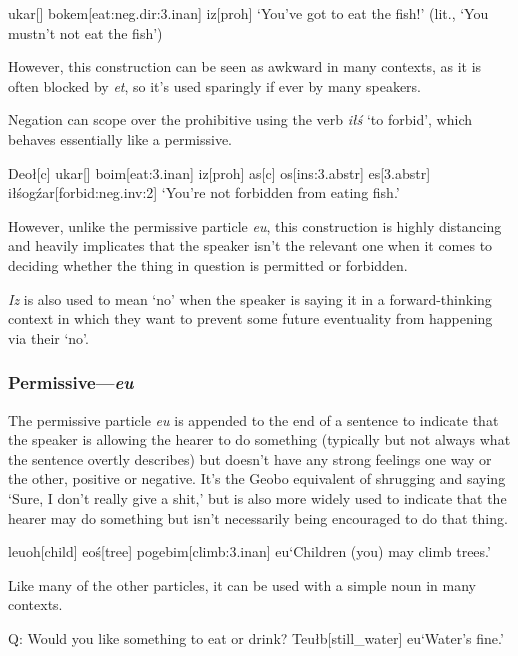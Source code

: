 \documentclass[a4paper,11pt,oneside,openany]{memoir}
\begin{document}
\ex 
\begingl
\Engma u\vz[fish]
kar[]
bo\vs kem[eat:{\sc neg.dir:3.inan}]
iz[\sc proh]
\glft `You've got to eat the fish!' (lit., `You mustn't not eat the fish')
\endgl
\xe

However, this construction can be seen as awkward in many contexts, as it is often blocked by \textit{\vd et}, so it's used sparingly if ever by many speakers.

Negation can scope over the prohibitive using the verb \textit{i\l\'s} `to forbid', which behaves essentially like a permissive.

\ex 
\begingl
Deo\l[\sc c]
\engma u\vz[fish]
kar[]
bo\vs im[eat:{\sc 3.inan}]
iz[\sc proh]
\nogloss{,}
as[\sc c]
\vc os[\sc ins:3.abstr]
es[\sc 3.abstr]
i\l\'sog\'zar[forbid:{\sc neg.inv:2}]
\glft `You're not forbidden from eating fish.'
\endgl
\xe

However, unlike the permissive particle \textit{eu\vs}, this construction is highly distancing and heavily implicates that the speaker isn't the relevant one when it comes to deciding whether the thing in question is permitted or forbidden.

\textit{Iz} is also used to mean `no' when the speaker is saying it in a forward-thinking context in which they want to prevent some future eventuality from happening via their `no'.

\subsubsection{Permissive---\textit{eu\vs}} 

The permissive particle \textit{eu\vs} is appended to the end of a sentence to indicate that the speaker is allowing the hearer to do something (typically but not always what the sentence overtly describes) but doesn't have any strong feelings one way or the other, positive or negative. It's the Geobo{\engma} equivalent of shrugging and saying `Sure, I don't really give a shit,' but is also more widely used to indicate that the hearer may do something but isn't necessarily being encouraged to do that thing.

\ex
\begingl
\vZ leuoh[child]
\vd eo\'s[tree]
pogebim[climb:{\sc 3.inan}]
eu\vs[\sc perm]
\glft `Children (you) may climb trees.'
\endgl
\xe

Like many of the other particles, it can be used with a simple noun in many contexts.

\ex 
\begingl
\glpreamble
Q: Would you like something to eat or drink?
\endpreamble
{}
Teu\l b[still\_water]
eu\vs[\sc perm]
\glft\phantom{A: }`Water's fine.'
\endgl
\xe
\end{document}
